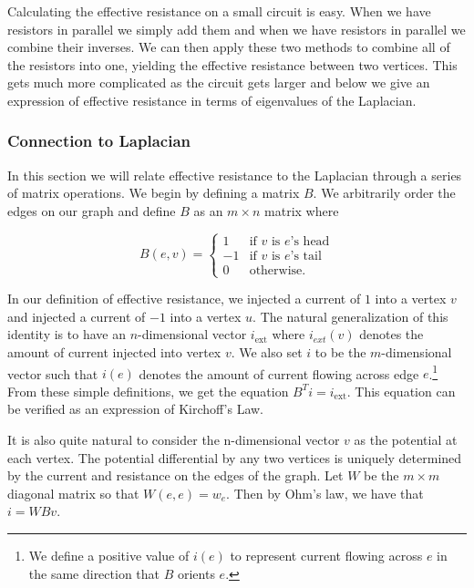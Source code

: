 \documentclass[12pt,twoside]{article}
\begin{document}

Calculating the effective resistance on a small circuit is easy. When we have resistors in parallel we simply add them and when we have resistors in parallel we combine their inverses. We can then apply these two methods to combine all of the resistors into one, yielding the effective resistance between two vertices. This gets much more complicated as the circuit gets larger and below we give an expression of effective resistance in terms of eigenvalues of the Laplacian. 


\subsubsection{Connection to Laplacian}

In this section we will relate effective resistance to the Laplacian through a series of matrix operations. We begin by defining a matrix $B$. We arbitrarily order the edges on our graph and define $B$ as an $m \times n$ matrix where

\begin{equation}
\label{def:resistance-b}
B(e,v)  = 
            \begin{cases}
                1     &\mbox{if $v$ is $e$'s head} \\
                -1    &\mbox{if $v$ is $e$'s tail} \\
                0     &\mbox{otherwise.} 
            \end{cases}
\end{equation}

In our definition of effective resistance, we injected a current of $1$ into a vertex $v$ and injected a current of $-1$ into a vertex $u$. The natural generalization of this identity is to have an $n$-dimensional vector $i_{\text{ext}}$ where $i_{ext}(v)$ denotes the amount of current injected into vertex $v$. We also set $i$ to be the $m$-dimensional vector such that $i(e)$ denotes the amount of current flowing across edge $e$.\footnote{We define a positive value of $i(e)$ to represent current flowing across $e$ in the same direction that $B$ orients $e$.} From these simple definitions, we get the equation $B^Ti = i_{\text{ext}}$. This equation can be verified as an expression of Kirchoff's Law.

It is also quite natural to consider the n-dimensional vector $v$ as the potential at each vertex. The potential differential by any two vertices is uniquely determined by the current and resistance on the edges of the graph. Let $W$ be the $m \times m$ diagonal matrix so that $W(e,e) = w_e$. Then by Ohm's law, we have that $i = WBv$. 
\end{document}
